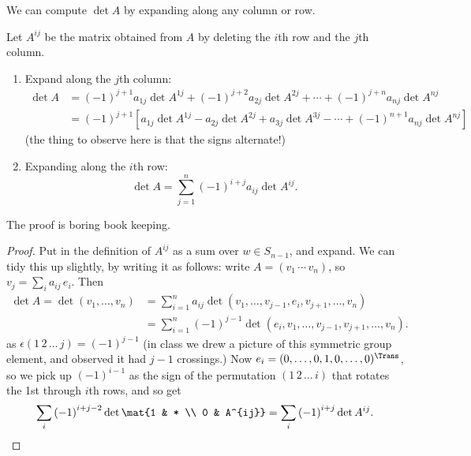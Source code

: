 \bigskip
\bigskip


We can compute $\det A$ by expanding along any column or row.

\begin{definition}
	Let $A^{ij}$ be the matrix obtained from $A$ by deleting the $i$th row and the $j$th column. %
\end{definition}

\begin{theorem}
	\begin{enumerate}
		\item Expand along the $j$th column:
		\begin{align*}
			   \det A
			&= \left( -1 \right)^{j+1} a_{1j} \det A^{1j}
			 + \left( -1 \right)^{j+2} a_{2j} \det A^{2j}
			 + \cdots
			 + \left( -1 \right)^{j+n} a_{nj} \det A^{nj} \\
			&= \left( -1 \right)^{j+1} \left[ a_{1j} \det A^{1j} - a_{2j} \det A^{2j} + a_{3j} \det A^{3j} - \cdots +\left( -1 \right)^{n+1} a_{nj} \det A^{nj} \right] %
		\end{align*}
(the thing to observe here is that the signs alternate!)
		\item Expanding along the $i$th row:
		\begin{equation*}
			\det A = \sum_{j=1}^n \left( -1 \right)^{i+j} a_{ij} \det A^{ij}.
		\end{equation*}
	\end{enumerate}%
\end{theorem}

The proof is boring book keeping.

\begin{proof} Put in the definition of $A^{ij}$ as a sum over $w\in S_{n-1}$, and expand. We can tidy this up slightly, by writing it as follows: write $A=\left( v_1\,\cdots\,v_n \right)$, so  $ v_j = \sum_i a_{ij} \, e_i$. Then
	\begin{align*}
	 	\det A
		 = \det(v_1,\ldots,v_n)
		&= \sum_{i=1}^n a_{ij} \det(v_1,\ldots,v_{j-1},e_i,v_{j+1},\ldots,v_n) \\
		&= \sum_{i=1}^n \left( -1 \right)^{j-1} \det\left( e_i,v_1,\ldots,v_{j-1},v_{j+1}, \ldots, v_n \right). %
	\end{align*}
	as $\epsilon(1 \,2\,\ldots\,j) = (-1)^{j-1}$ (in class we drew a picture of this symmetric group element, and observed it had $j-1$ crossings.) Now $e_i=(0,\ldots,0,1,0,\ldots,0)^\Trans$, so we pick up $\left( -1 \right)^{i-1}$ as the sign of the permutation $(1 \,2\,\ldots\,i )$ that rotates the 1st through $i$th rows, and so get %
	\begin{equation*}
		\sum_i \left( -1 \right)^{i+j-2} \det\mat{1 & * \\ 0 & A^{ij}} = \sum_i \left( -1 \right)^{i+j} \det A^{ij}. \qedhere %
	\end{equation*}
\end{proof}


